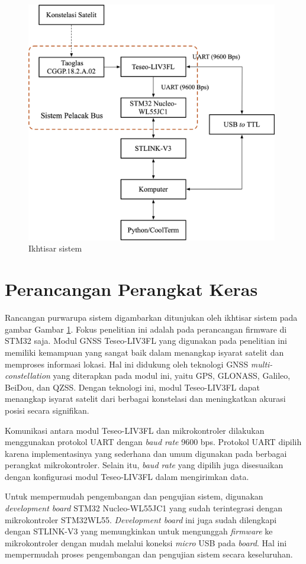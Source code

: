\begin{figure}[H]
	\centering
	\includegraphics[width=11cm]{contents/chapter-3/system-overview.png}
	\caption{Ikhtisar sistem}
	\label{Fig: system-overview}
\end{figure}

\section{Perancangan Perangkat Keras}
Rancangan purwarupa sistem digambarkan ditunjukan oleh ikhtisar sistem pada gambar Gambar  \ref{Fig: system-overview}. Fokus penelitian ini adalah pada perancangan firmware di STM32 saja.  Modul GNSS Teseo\hyp{}LIV3FL yang digunakan pada penelitian ini memiliki kemampuan yang sangat baik dalam menangkap isyarat satelit dan memproses informasi lokasi. Hal ini didukung oleh teknologi GNSS \textit{multi-constellation} yang diterapkan pada modul ini, yaitu GPS, GLONASS, Galileo, BeiDou, dan QZSS. Dengan teknologi ini, modul Teseo\hyp{}LIV3FL dapat menangkap isyarat satelit dari berbagai konstelasi dan meningkatkan akurasi posisi secara signifikan.

Komunikasi antara modul Teseo\hyp{}LIV3FL dan mikrokontroler dilakukan menggunakan protokol UART dengan \textit{baud rate} 9600 bps. Protokol UART dipilih karena implementasinya yang sederhana dan umum digunakan pada berbagai perangkat mikrokontroler. Selain itu, \textit{baud rate} yang dipilih juga disesuaikan dengan konfigurasi modul Teseo\hyp{}LIV3FL dalam mengirimkan data.

Untuk mempermudah pengembangan dan pengujian sistem, digunakan \textit{development board} STM32 Nucleo-WL55JC1 yang sudah terintegrasi dengan mikrokontroler STM32WL55. \textit{Development board} ini juga sudah dilengkapi dengan STLINK-V3 yang memungkinkan untuk mengunggah \textit{firmware} ke mikrokontroler dengan mudah melalui koneksi \textit{micro} USB pada \textit{board}. Hal ini mempermudah proses pengembangan dan pengujian sistem secara keseluruhan.

